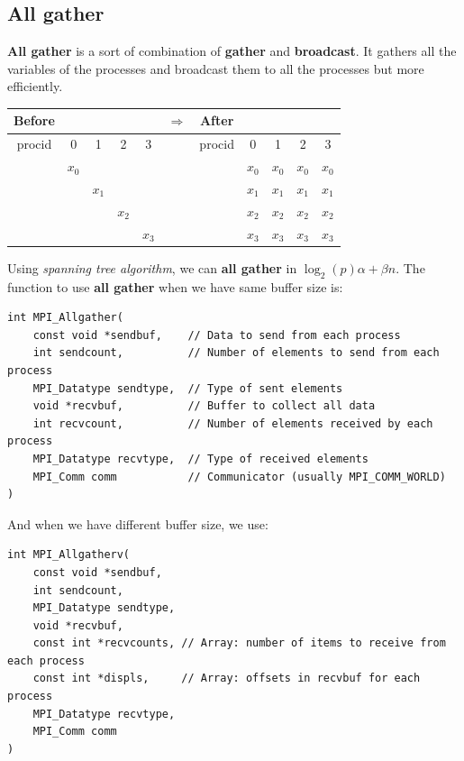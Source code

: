 \documentclass[12pt, openany]{report}
\theoremstyle{definition}
\begin{document}
\subsection{All gather}
\textbf{All gather} is a sort of combination of \textbf{gather} and \textbf{broadcast}. It gathers all the variables of the processes and broadcast them to all the processes but more efficiently.\\
\begin{center}
	\begin{tabular}{ccccc|c|ccccc}
		Before &&&&& $\Longrightarrow$ &After&&&&\\
		\hline
		procid & 0 & 1 & 2 & 3 & & procid & 0 & 1 & 2 & 3\\
		\hline
		& $x_0$ &&&&& & $x_0$ & $x_0$ & $x_0$ & $x_0$\\
		&& $x_1$ &&&& & $x_1$ & $x_1$ & $x_1$ & $x_1$\\
		&&& $x_2$ &&& & $x_2$ & $x_2$ & $x_2$ & $x_2$\\
		&&&& $x_3$ && & $x_3$ & $x_3$ & $x_3$ & $x_3$\\
		\hline
	\end{tabular}
\end{center}
Using \textit{spanning tree algorithm}, we can \textbf{all gather} in $\log_2(p)\alpha + \beta n$. The function to use \textbf{all gather} when we have same buffer size is:
\begin{lstlisting}[style=CppStyle]
int MPI_Allgather(
    const void *sendbuf,    // Data to send from each process
    int sendcount,          // Number of elements to send from each process
    MPI_Datatype sendtype,  // Type of sent elements
    void *recvbuf,          // Buffer to collect all data
    int recvcount,          // Number of elements received by each process
    MPI_Datatype recvtype,  // Type of received elements
    MPI_Comm comm           // Communicator (usually MPI_COMM_WORLD)
)
\end{lstlisting}
And when we have different buffer size, we use:
\begin{lstlisting}[style=CppStyle]
int MPI_Allgatherv(
    const void *sendbuf,
    int sendcount,
    MPI_Datatype sendtype,
    void *recvbuf,
    const int *recvcounts, // Array: number of items to receive from each process
    const int *displs,     // Array: offsets in recvbuf for each process
    MPI_Datatype recvtype,
    MPI_Comm comm
)
\end{lstlisting}
\end{document}
